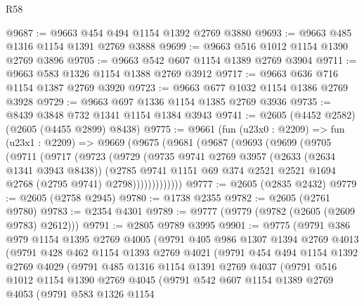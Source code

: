 \begin{lexlean}{R58}
\begin{coremodule}
@9687 := @9663 @454 @494 @1154 @1392 @2769 @3880
@9693 := @9663 @485 @1316 @1154 @1391 @2769 @3888
@9699 := @9663 @516 @1012 @1154 @1390 @2769 @3896
@9705 := @9663 @542 @607 @1154 @1389 @2769 @3904
@9711 := @9663 @583 @1326 @1154 @1388 @2769 @3912
@9717 := @9663 @636 @716 @1154 @1387 @2769 @3920
@9723 := @9663 @677 @1032 @1154 @1386 @2769 @3928
@9729 := @9663 @697 @1336 @1154 @1385 @2769 @3936
@9735 := @8439 @3848 @732 @1341 @1154 @1384 @3943
@9741 := @2605 (@4452 @2582) (@2605 (@4455 @2899) @8438)
@9775 := @9661
    (fun (u23x0 : @2209) =>
    fun (u23x1 : @2209) =>
    @9669
      (@9675
        (@9681
          (@9687
            (@9693
              (@9699
                (@9705
                  (@9711
                    (@9717
                      (@9723
                        (@9729
                          (@9735
                            @9741
                            @2769
                            @3957
                            (@2633 (@2634 @1341 @3943 @8438))
                            (@2785
                              @9741
                              @1151
                              @69
                              @374
                              @2521
                              @2521
                              @1694
                              @2768
                              (@2795 @9741)
                              @2798)))))))))))))
@9777 := @2605 (@2835 @2432)
@9779 := @2605 (@2758 @2945)
@9780 := @1738 @2355
@9782 := @2605 (@2761 @9780)
@9783 := @2354 @4301
@9789 := @9777 (@9779 (@9782 (@2605 (@2609 @9783) @2612)))
@9791 := @2805 @9789 @3995
@9901 := @9775
    (@9791
      @386
      @979
      @1154
      @1395
      @2769
      @4005
      (@9791
        @405
        @986
        @1307
        @1394
        @2769
        @4013
        (@9791
          @428
          @462
          @1154
          @1393
          @2769
          @4021
          (@9791
            @454
            @494
            @1154
            @1392
            @2769
            @4029
            (@9791
              @485
              @1316
              @1154
              @1391
              @2769
              @4037
              (@9791
                @516
                @1012
                @1154
                @1390
                @2769
                @4045
                (@9791
                  @542
                  @607
                  @1154
                  @1389
                  @2769
                  @4053
                  (@9791
                    @583
                    @1326
                    @1154

\end{coremodule}
\end{lexlean}
